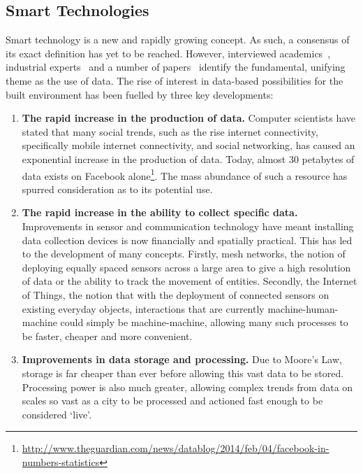 \documentclass[conference]{IEEEtran}
\begin{document}
\subsection{Smart Technologies}

Smart technology is a new and rapidly growing concept. As such, a
consensus of its exact definition has yet to be reached. However,
interviewed academics~\cite{elecgen:2013}, industrial
experts~\cite{buscher:2014} and a number of
papers~\cite{komninos:2002,arup-et-al:2011,harrison+abbottdonnelly:2011,batty-et-al:2012} identify
the fundamental, unifying theme as the use of data. The rise of
interest in data-based possibilities for the built environment has
been fuelled by three key developments:

\begin{enumerate}
\item {\textbf{The rapid increase in the production of data.}}
  Computer scientists have stated that many social trends, such as the
  rise internet connectivity, specifically mobile internet
  connectivity, and social networking, has caused an exponential
  increase in the production of data. Today, almost 30 petabytes of
  data exists on Facebook alone\footnote{\url{http://www.theguardian.com/news/datablog/2014/feb/04/facebook-in-numbers-statistics}}. The mass abundance of such a
  resource has spurred consideration as to its potential use.
\item {\textbf{The rapid increase in the ability to collect specific
      data.}} Improvements in sensor and communication technology have
  meant installing data collection devices is now financially and
  spatially practical. This has led to the development of many
  concepts. Firstly, mesh networks, the notion of deploying equally
  spaced sensors across a large area to give a high resolution of data
  or the ability to track the movement of entities. Secondly, the
  Internet of Things, the notion that with the deployment of
  connected sensors on existing everyday objects, interactions that
  are currently machine-human-machine could simply be machine-machine,
  allowing many such processes to be faster, cheaper and  more
  convenient. 
\item {\textbf{Improvements in data storage and processing.}} Due to
  Moore’s Law, storage is far cheaper than ever before allowing
  this vast data to be stored. Processing power is also much greater,
  allowing complex trends from data on scales so vast as a city to be
  processed and actioned fast enough to be considered `live'.
\end{enumerate}
\end{document}
